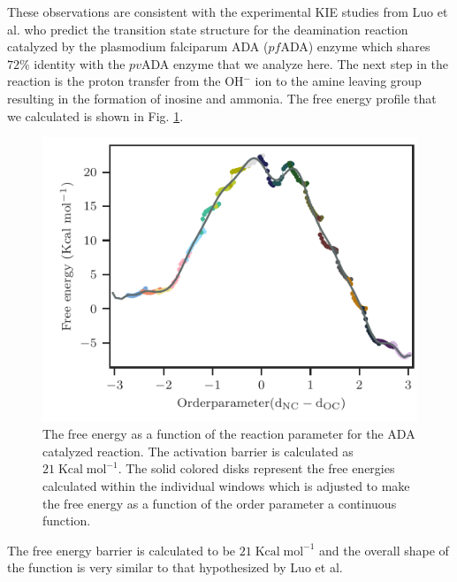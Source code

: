 \documentclass[journal=jpcbfk,manuscript=article,layout=traditional]{achemso}
\begin{document}
These observations are consistent with the 
experimental KIE studies from Luo et al. \cite{Luo07JAmChemSoc129p8008}
who predict the transition state structure for the deamination reaction 
catalyzed by the plasmodium falciparum ADA ($pf$ADA) enzyme which shares
$72\%$ identity with the $pv$ADA enzyme that we analyze here. The next
step in the reaction is the proton transfer from the OH$^{-}$ ion to the 
amine leaving group resulting in the formation of inosine and ammonia.   
The free energy profile that we calculated is shown in Fig. \ref{fig:ada-fenergy}.  
\begin{figure}[h!]
\centering
\includegraphics[scale=1.0]{figures/ada-fenergy.pdf}
\caption{The free energy as a function of the reaction 
parameter for the ADA catalyzed reaction. The activation barrier is calculated as 
$21\;\text{Kcal}\;\text{mol}^{-1}$. The solid colored disks represent the free energies 
calculated within the individual windows which is adjusted to make the free energy as a function 
of the order parameter a continuous function.}
\label{fig:ada-fenergy}
\end{figure}
The free energy barrier is calculated to be $21\;\text{Kcal}\;\text{mol}^{-1}$
and the overall shape of the function is very similar to that hypothesized 
by Luo et al. \cite{Luo07JAmChemSoc129p8008}
\end{document}
